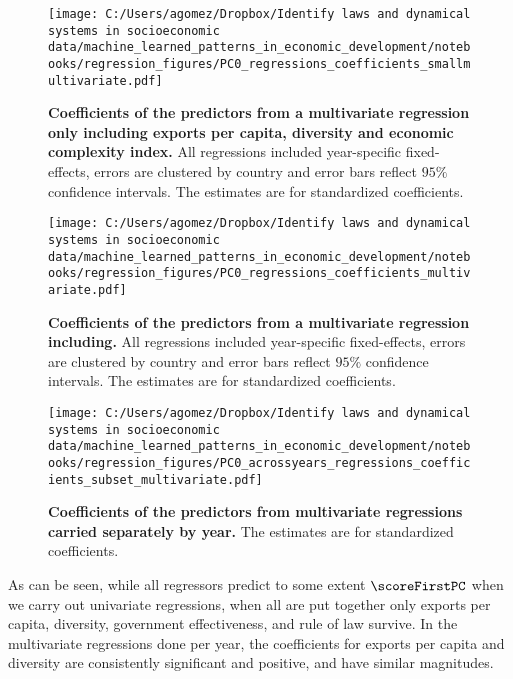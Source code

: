 \begin{figure}[htb]
\begin{center}
\texttt{[image: C:/Users/agomez/Dropbox/Identify laws and dynamical systems in socioeconomic data/machine\_learned\_patterns\_in\_economic\_development/notebooks/regression\_figures/PC0\_regressions\_coefficients\_smallmultivariate.pdf]}
\caption{
\textbf{Coefficients of the predictors from a multivariate regression only including exports per capita, diversity and economic complexity index.} 
 All regressions included year-specific fixed-effects, errors are clustered by country and error bars reflect $95\%$ confidence intervals. The estimates are for standardized coefficients.}
\label{fig:regcoefs_smallmultivariate}
\end{center}
\end{figure}

\begin{figure}[htb]
\begin{center}
\texttt{[image: C:/Users/agomez/Dropbox/Identify laws and dynamical systems in socioeconomic data/machine\_learned\_patterns\_in\_economic\_development/notebooks/regression\_figures/PC0\_regressions\_coefficients\_multivariate.pdf]}
\caption{
\textbf{Coefficients of the predictors from a multivariate regression including.} 
 All regressions included year-specific fixed-effects, errors are clustered by country and error bars reflect $95\%$ confidence intervals. The estimates are for standardized coefficients.}
\label{fig:regcoefs_multivariate}
\end{center}
\end{figure}


\begin{figure}[htb]
\begin{center}
\texttt{[image: C:/Users/agomez/Dropbox/Identify laws and dynamical systems in socioeconomic data/machine\_learned\_patterns\_in\_economic\_development/notebooks/regression\_figures/PC0\_acrossyears\_regressions\_coefficients\_subset\_multivariate.pdf]}
\caption{
\textbf{Coefficients of the predictors from multivariate regressions carried separately by year.} 
 The estimates are for standardized coefficients.}
\label{fig:regcoefs_acrossyears}
\end{center}
\end{figure}


As can be seen, while all regressors predict to some extent $\scoreFirstPC$ when we carry out univariate regressions, when all are put together only exports per capita, diversity, government effectiveness, and rule of law survive. In the multivariate regressions done per year, the coefficients for exports per capita and diversity are consistently significant and positive, and have similar magnitudes.
